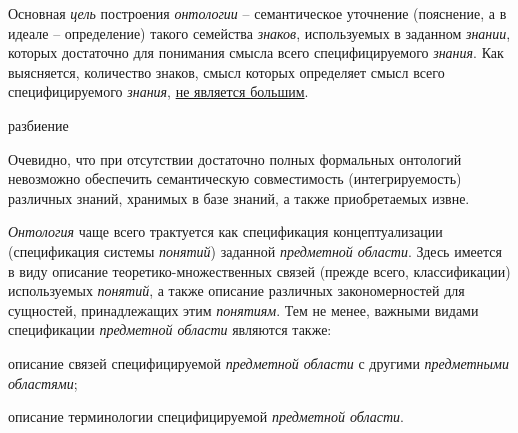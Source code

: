 Основная \textit{цель} построения \textit{онтологии} – семантическое уточнение (пояснение, а в идеале – определение) такого семейства \textit{знаков}, используемых в заданном \textit{знании}, которых достаточно для понимания смысла всего специфицируемого \textit{знания}. Как выясняется, количество знаков, смысл которых определяет смысл всего специфицируемого \textit{знания}, \uline{не является большим}.

\begin{SCn}
	\begin{scnrelfromset}{разбиение}
		\begin{scnindent}
		\end{scnindent}
	\end{scnrelfromset}
\end{SCn}

Очевидно, что при отсутствии достаточно полных формальных онтологий невозможно обеспечить семантическую совместимость (интегрируемость) различных знаний, хранимых в базе знаний, а также приобретаемых извне.

\textit{Онтология} чаще всего трактуется как спецификация концептуализации (спецификация системы \textit{понятий}) заданной \textit{предметной области}. Здесь имеется в виду описание теоретико-множественных связей (прежде всего, классификации) используемых \textit{понятий}, а также описание различных закономерностей для сущностей, принадлежащих этим \textit{понятиям}. Тем не менее, важными видами спецификации \textit{предметной области} являются также:
\begin{textitemize}
	\item описание связей специфицируемой \textit{предметной области} с другими \textit{предметными областями};
	\item описание терминологии специфицируемой \textit{предметной области}.
\end{textitemize}

\begin{SCn}
\end{SCn}

